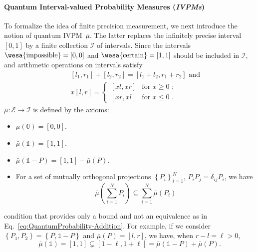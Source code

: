\documentclass[english,reprint, aps, prl,superscriptaddress, showpacs,
showkeys, longbibliography, amsmath, amssymb]{revtex4-1}
\theoremstyle{plain}
\theoremstyle{definition}
\newcommand{\events}{\ensuremath{\mathcal{E}}}
\newcommand{\imposs}{{\text{\wesa{impossible}}}}
\newcommand{\necess}{{\text{\wesa{certain}}}}
\begin{document}
\paragraph{Quantum Interval-valued Probability Measures (\emph{IVPMs})}

To formalize the idea of finite precision measurement, we next introduce
the notion of quantum IVPM~$\bar{\mu}$. The latter replaces the
infinitely precise interval $[0,1]$ by a finite collection $\mathscr{I}$
of intervals. Since the intervals $\imposs=\left[0,0\right]$ and
$\necess=\left[1,1\right]$ should be included in $\mathscr{I}$,
and arithmetic operations on intervals satisfy \begin{subequations}\label{eq:interval-operations}
\begin{eqnarray}
 &  & [l_{1},r_{1}]+[l_{2},r_{2}]=[l_{1}+l_{2},r_{1}+r_{2}]\textrm{ and}\\
 &  & x[l,r]=\begin{cases}
[xl,xr] & \textrm{for }x\ge0\textrm{ ;}\\{}
[xr,xl] & \textrm{for }x\le0\textrm{ .}
\end{cases}
\end{eqnarray}
\end{subequations} $\bar{\mu}:\events\rightarrow\mathscr{I}$ is
defined by the axioms: 
\begin{itemize}
\item $\bar{\mu}(\mathbb{0})=\left[0,0\right]$. 
\item $\bar{\mu}(\mathbb{1})=\left[1,1\right]$. 
\item $\bar{\mu}\left(\mathbb{1}-P\right)=\left[1,1\right]-\bar{\mu}\left(P\right)$. 
\item For a set of mutually orthogonal projections $\left\{ P_{i}\right\} _{i=1}^{N}$,
$P_{i}P_{j}=\delta_{ij}P_{i}$, we have 
\begin{equation}
\bar{\mu}\left(\sum_{i=1}^{N}P_{i}\right)\subseteq\sum_{i=1}^{N}\bar{\mu}\left(P_{i}\right)\label{eq:QuantumInterval-valuedProbability-Inclusion}
\end{equation}
\end{itemize}
condition that provides only a bound and not an equivalence as in
Eq.~\eqref{eq:QuantumProbability-Addition}. For example, if we consider
$\left\{ P_{1},P_{2}\right\} =\left\{ P,\mathbb{1}-P\right\} $ and
$\bar{\mu}\left(P\right)=\left[l,r\right]$, we have, when $r-l=\ell>0$,
\[
\bar{\mu}(\mathbb{1})=\left[1,1\right]\subsetneq\left[1-\ell,1+\ell\right]=\bar{\mu}\left(\mathbb{1}-P\right)+\bar{\mu}\left(P\right).
\]
\end{document}
